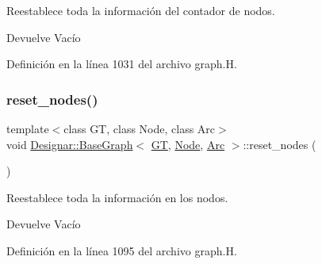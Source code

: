 Reestablece toda la información del contador de nodos. 

\begin{DoxyReturn}{Devuelve}
Vacío 
\end{DoxyReturn}


Definición en la línea 1031 del archivo graph.\+H.

\mbox{\label{class_designar_1_1_base_graph_a1b21c48fed41f36ad4158d718f837c89}} 
\subsubsection{\texorpdfstring{reset\+\_\+nodes()}{reset\_nodes()}}
{\footnotesize\ttfamily template$<$class GT, class Node, class Arc$>$ \\
void \hyperlink{class_designar_1_1_base_graph}{Designar\+::\+Base\+Graph}$<$ \hyperlink{demo-buildgraph_8_c_a3001c40d2c31ca87ed96cd7d1334a55e}{GT}, \hyperlink{namespace_designar_a5af326c65aa2bd26b26c410f2030d09e}{Node}, \hyperlink{namespace_designar_a3f55fb5513d62ff47cbc8f72b8e95d6f}{Arc} $>$\+::reset\+\_\+nodes (\begin{DoxyParamCaption}{ }\end{DoxyParamCaption})\hspace{0.3cm}{\ttfamily [inline]}}



Reestablece toda la información en los nodos. 

\begin{DoxyReturn}{Devuelve}
Vacío 
\end{DoxyReturn}


Definición en la línea 1095 del archivo graph.\+H.

\mbox{\label{class_designar_1_1_base_graph_ae8845b2eb9d33f62684c8e5acc7c91b7}} 
